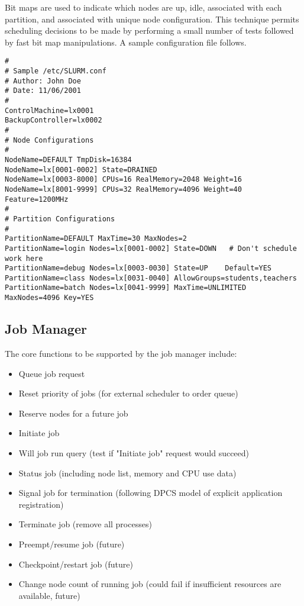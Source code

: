 Bit maps are used to indicate which nodes are up, idle, associated with 
each partition, and associated with unique node configuration. 
This technique permits scheduling decisions to be made by performing a 
small number of tests followed by fast bit map manipulations. 
A sample configuration file follows.

\begin{verbatim}
# 
# Sample /etc/SLURM.conf
# Author: John Doe
# Date: 11/06/2001
#
ControlMachine=lx0001
BackupController=lx0002
#
# Node Configurations
#
NodeName=DEFAULT TmpDisk=16384
NodeName=lx[0001-0002] State=DRAINED
NodeName=lx[0003-8000] CPUs=16 RealMemory=2048 Weight=16
NodeName=lx[8001-9999] CPUs=32 RealMemory=4096 Weight=40 Feature=1200MHz
#
# Partition Configurations
#
PartitionName=DEFAULT MaxTime=30 MaxNodes=2
PartitionName=login Nodes=lx[0001-0002] State=DOWN   # Don't schedule work here
PartitionName=debug Nodes=lx[0003-0030] State=UP    Default=YES
PartitionName=class Nodes=lx[0031-0040] AllowGroups=students,teachers
PartitionName=batch Nodes=lx[0041-9999] MaxTime=UNLIMITED MaxNodes=4096 Key=YES
\end{verbatim}

\subsection{Job Manager}

The core functions to be supported by the job manager include:
\begin{itemize}
\item Queue job request
\item Reset priority of jobs (for external scheduler to order queue)
\item Reserve nodes for a future job
\item Initiate job
\item Will job run query (test if "Initiate job" request would succeed)
\item Status job (including node list, memory and CPU use data)
\item Signal job for termination (following DPCS model of explicit application
registration)
\item Terminate job (remove all processes)
\item Preempt/resume job  (future)
\item Checkpoint/restart job (future)
\item Change node count of running job (could fail if insufficient resources are 
available, future)
\end{itemize}

